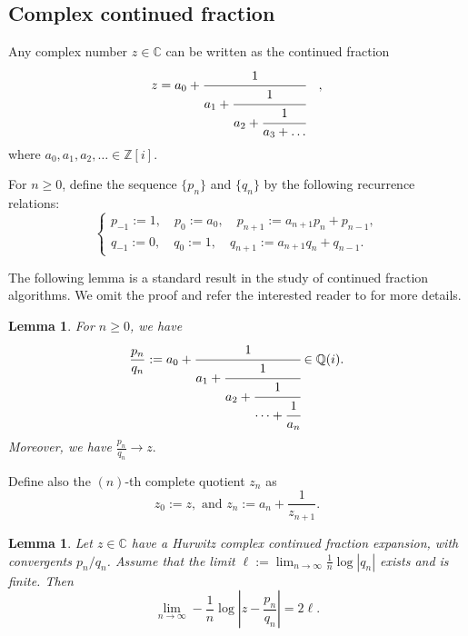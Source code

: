 \documentclass[11pt]{amsart}
\theoremstyle{plain}
\newtheorem{lemma}[theorem]{Lemma}
\theoremstyle{definition}
\renewcommand\~{\tilde}%
\numberwithin{equation}{section}
\begin{document}
\subsection{Complex continued fraction}
Any complex number $z \in \mathbb{C}$ can be written as the continued fraction
$$
z = a_0 + \cfrac{1}{a_1 +
      \cfrac{1}{a_2 +
      \cfrac{1}{a_3 + \dots}}} \quad,
$$
where $a_0,a_1,a_2,\dots \in \mathbb{Z}[i].$

For $n \ge 0$, define the sequence $\{p_n\}$ and $\{q_n\}$ by the following recurrence relations:
$$
\begin{cases}
p_{-1}:=1,\quad p_0:=a_0, \quad p_{n+1}:=a_{n+1}p_n+p_{n-1},\\
q_{-1}:=0,\quad q_0:=1, \quad q_{n+1}:=a_{n+1}q_n+q_{n-1}.
\end{cases}
$$

The following lemma is a standard result in the study of continued fraction algorithms. We omit the proof and refer the interested reader to \cite[Theorem 6.1]{DaniNogueira14} for more details.
\begin{lemma}
For $n \ge 0$, we have
$$\frac{p_n}{q_n} := a_0 + \cfrac{1}{a_1 +
      \cfrac{1}{a_2 + 
      \cfrac{1}{\dots+ \cfrac{1}{a_n}}}} \in \mathbb{Q}(i).$$
Moreover, we have $\frac{p_n}{q_n} \to z.$
\end{lemma}


Define also the $(n)$-th complete quotient $z_n$ as
$$z_0 := z, \text{ and } z_{n} := a_n+\frac{1}{z_{n+1}}.$$





\begin{lemma}\label{lem:number-theory}
Let $z \in \mathbb{C}$ have a Hurwitz complex continued fraction expansion, with convergents $p_n/q_n$. Assume that the limit
$
\ell := \lim_{n\to\infty} \frac{1}{n}\log |q_n|
$
exists and is finite. Then
$$
\lim_{n\to\infty} -\frac{1}{n}\log\left|z-\frac{p_n}{q_n}\right| = 2\ell.
$$
\end{lemma}
\end{document}
